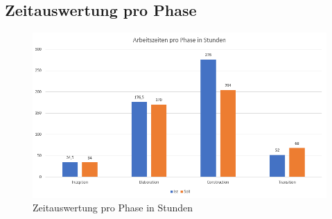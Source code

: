 \subsection{Zeitauswertung pro Phase}
\begin{figure}[H]
    \centering
    \includegraphics[width=1\linewidth]{assets/zeitauswertung_phasen.png}
    \caption{Zeitauswertung pro Phase in Stunden}
\end{figure}